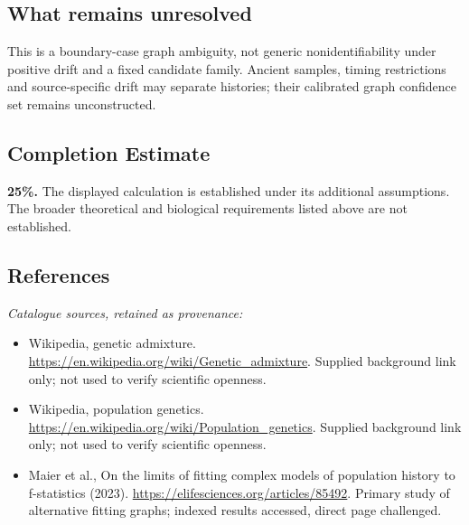 \documentclass[11pt]{article}
\begin{document}
\subsection{What remains unresolved}
This is a boundary-case graph ambiguity, not generic nonidentifiability under positive drift and a fixed candidate family. Ancient samples, timing restrictions and source-specific drift may separate histories; their calibrated graph confidence set remains unconstructed.
\subsection{Completion Estimate}
\textbf{25\%.} The displayed calculation is established under its additional assumptions. The broader theoretical and biological requirements listed above are not established.
\subsection{References}
\noindent\emph{Catalogue sources, retained as provenance:}
\begin{itemize}
\item Wikipedia, genetic admixture. \url{https://en.wikipedia.org/wiki/Genetic_admixture}. Supplied background link only; not used to verify scientific openness.
\item Wikipedia, population genetics. \url{https://en.wikipedia.org/wiki/Population_genetics}. Supplied background link only; not used to verify scientific openness.
\item Maier et al., On the limits of fitting complex models of population history to f-statistics (2023). \url{https://elifesciences.org/articles/85492}. Primary study of alternative fitting graphs; indexed results accessed, direct page challenged.
\end{itemize}
\end{document}
